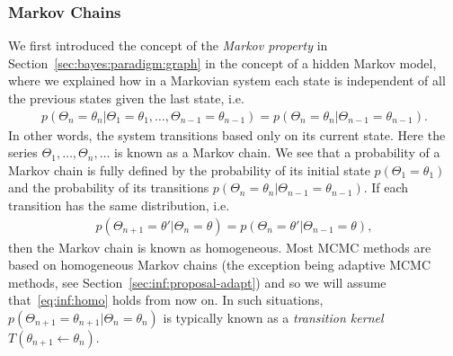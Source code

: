 \subsubsection{Markov Chains}
\label{sec:inf:foundation:mcmc:markov}

We first introduced the concept of the \emph{Markov property} in Section~\ref{sec:bayes:paradigm:graph}
in the concept of a hidden Markov model, where we explained how in a Markovian system each state
is independent of all the previous states given the last state, i.e. 
\begin{align}
\label{eq:inf:markov-prop}
p(\Theta_n = \theta_n | \Theta_1 = \theta_1, \dots, \Theta_{n-1} = \theta_{n-1}) = p(\Theta_n = \theta_n  | \Theta_{n-1} = \theta_{n-1}).
\end{align}
In other words, the system transitions based only on its current state.  Here the series $\Theta_1,\dots,\Theta_n,\dots$ 
is known as a Markov chain.  We see that a probability of a Markov chain is fully defined
by the probability of its initial state $p(\Theta_1 = \theta_1)$ and the probability of its transitions
$p(\Theta_n = \theta_n  | \Theta_{n-1} = \theta_{n-1})$.  If each transition has the same distribution, i.e.
\begin{align}
\label{eq:inf:homo}
p(\Theta_{n+1} = \theta'  | \Theta_{n} = \theta) = p(\Theta_{n} = \theta' | \Theta_{n-1} = \theta),
\end{align}
then the Markov chain is known as homogeneous.  Most MCMC methods are based on
homogeneous Markov chains (the exception being adaptive MCMC methods, see Section~\ref{sec:inf:proposal-adapt})
and so we will assume that~\eqref{eq:inf:homo} holds from now on.  In such situations,
$p(\Theta_{n+1} = \theta_{n+1}  | \Theta_{n} = \theta_{n})$ is typically known as a \emph{transition kernel}
$T(\theta_{n+1} \leftarrow \theta_n)$.

